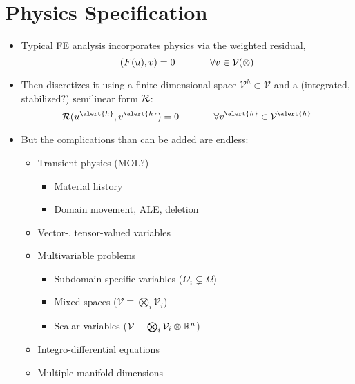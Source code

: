 \section{Physics Specification}
%

\begin{frame}[<+->]
  \begin{itemize}
  \item {Typical FE analysis incorporates physics via
    the weighted residual,
    \begin{equation}
      \nonumber
        (F( u ), v) = 0 \hspace{.5in} \forall v \in \mathcal{V(\Omega)}
    \end{equation}
    }
  \item{ Then discretizes it using a
    finite-dimensional space $\mathcal{V}^h \subset \mathcal{V}$ and a
          (integrated, stabilized?) semilinear form ${\mathcal R}$:
    \begin{equation}
      \nonumber
      \Res( u^{\alert{h}}, v^{\alert{h}}) = 0 \hspace{.5in} \forall v^{\alert{h}} \in \mathcal{V}^{\alert{h}}
  \end{equation}}
  \item But the complications than can be added are endless:
      \begin{itemize} 
      \item Transient physics (MOL?)
          \begin{itemize}
              \item Material history
              \item Domain movement, ALE, deletion 
          \end{itemize}
      \item Vector-, tensor-valued variables
      \item Multivariable problems
          \begin{itemize}
              \item Subdomain-specific variables ($\Omega_i \subsetneq \Omega$)
              \item Mixed spaces ($\mathcal{V} \equiv \bigotimes_i \mathcal{V}_i$)
              \item Scalar variables ($\mathcal{V} \equiv \bigotimes_i \mathcal{V}_i \otimes \mathbb{R}^n$)
          \end{itemize}
      \item Integro-differential equations
      \item Multiple manifold dimensions
      \end{itemize}

  \end{itemize}
\end{frame}





